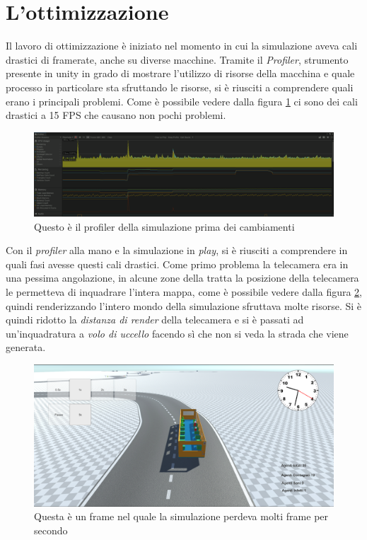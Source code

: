 \documentclass[12pt, openany]{book}
\begin{document}
 	\section{L'ottimizzazione}
 	Il lavoro di ottimizzazione è iniziato nel momento in cui la simulazione aveva cali drastici di framerate, anche su diverse macchine. Tramite il \emph{Profiler}, strumento presente in unity in grado di mostrare l'utilizzo di risorse della macchina e quale processo in particolare sta sfruttando le risorse, si è riusciti a comprendere quali erano i principali problemi. Come è possibile vedere dalla figura \ref{fig:ProfilerFPSBassi} ci sono dei cali drastici a 15 FPS che causano non pochi problemi.
 	\begin{figure}[H]
 		\centering
 		\includegraphics[width=1\linewidth]{"Immagini/ProfilerFPSBassi.png"}
 		\caption{Questo è il profiler della simulazione prima dei cambiamenti}
 		\label{fig:ProfilerFPSBassi}
 	\end{figure}
 	Con il \emph{profiler} alla mano e la simulazione in \emph{play}, si è riusciti a comprendere in quali fasi avesse questi cali drastici. Come primo problema la telecamera era in una pessima angolazione, in alcune zone della tratta la posizione della telecamera le permetteva di inquadrare l'intera mappa, come è possibile vedere dalla figura \ref{fig:CameraBrutta}, quindi renderizzando l'intero mondo della simulazione sfruttava molte risorse. Si è quindi ridotto la \emph{distanza di render} della telecamera e si è passati ad un'inquadratura a \emph{volo di uccello} facendo sì che non si veda la strada che viene generata.
 	\begin{figure}[H]
 		\centering
 		\includegraphics[width=1\linewidth]{"Immagini/CameraBrutta.png"}
 		\caption{Questa è un frame nel quale la simulazione perdeva molti frame per secondo}
 		\label{fig:CameraBrutta}
 	\end{figure}
\end{document}
